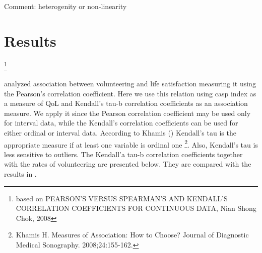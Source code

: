\documentclass[10pt, letterpaper]{article}
\begin{document}
\begin{spacing}{1.4}
Comment: heterogenity or non-linearity  



\section{Results}\footnote{based on PEARSON'S VERSUS SPEARMAN'S AND KENDALL'S CORRELATION COEFFICIENTS FOR CONTINUOUS DATA, Nian Shong Chok, 2008}

\citet{haski09} analyzed association between volunteering and life satisfaction measuring it using the Pearson's correlation coefficient. Here we use this relation  using casp index as a measure of QoL and Kendall's tau-b correlation coefficients as an association measure. We apply it since the Pearson correlation coefficient may be used only for interval data, while the Kendall's correlation coefficients can be used for either ordinal or interval data. According to Khamis ()  Kendall's tau is the appropriate measure if at least one variable is ordinal one \footnote{Khamis H. Measures of Association: How to Choose? Journal of Diagnostic Medical Sonography. 2008;24:155-162.}. Also, Kendall's tau is less sensitive to outliers. The Kendall'a tau-b correlation coefficients together with the rates of volunteering are presented below. They are compared with the results in \citet{haski09}. 



\end{spacing}
\end{document}
